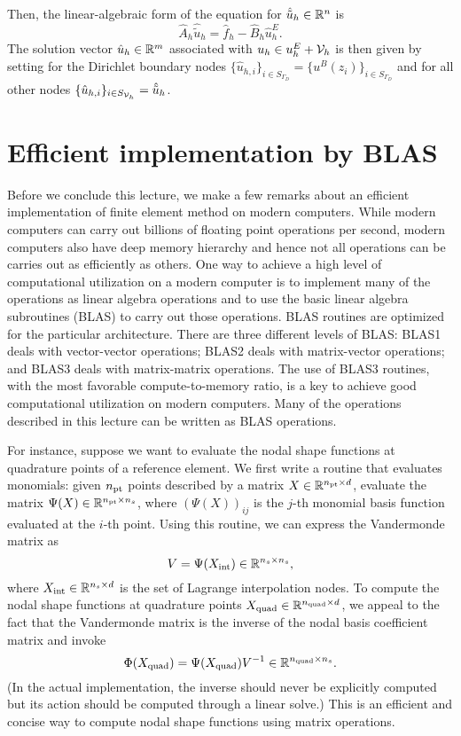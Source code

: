 Then, the linear-algebraic form of the equation for $\hat{\tilde u}_h \in \mathbb{R}^n$ is
\begin{equation*}
  \hat A_h \hat{\tilde u}_h = \hat f_h - \hat B_h \hat u^E_h.
\end{equation*}
The solution vector $\hat u_h \in \mathbb{R}^m$ associated with $u_h \in u^E_h + \mathcal{V}_h$ is then given by setting for the Dirichlet boundary nodes $\{ \hat u_{h,i} \}_{i \in S_{\Gamma_D}} = \{ u^B(z_i) \}_{i \in S_{\Gamma_D}}$ and for all other nodes $\{ \hat u_{h,i} \}_{i \in S_{\mathcal{V}_h}} = \hat{\tilde u}_h$.

\section{Efficient implementation by BLAS}
\label{sec:fe_impl_blas}
Before we conclude this lecture, we make a few remarks about an efficient implementation of finite element method on modern computers.  While modern computers can carry out billions of floating point operations per second, modern computers also have deep memory hierarchy and hence not all operations can be carries out as efficiently as others.  One way to achieve a high level of computational utilization on a modern computer is to implement many of the operations as linear algebra operations and to use the basic linear algebra subroutines (BLAS) to carry out those operations.  BLAS routines are optimized for the particular architecture.  There are three different levels of BLAS: BLAS1 deals with vector-vector operations; BLAS2 deals with matrix-vector operations; and BLAS3 deals with matrix-matrix operations. The use of BLAS3 routines, with the most favorable compute-to-memory ratio, is a key to achieve good computational utilization on modern computers.  Many of the operations described in this lecture can be written as BLAS operations.

For instance, suppose we want to evaluate the nodal shape functions at quadrature points of a reference element.  We first write a routine that evaluates monomials: given $n_{\rm pt}$ points described by a matrix $X \in \mathbb{R}^{n_{\rm pt} \times d}$, evaluate the matrix $\Psi(X) \in \mathbb{R}^{n_{\rm pt} \times n_s}$, where $(\Psi(X))_{ij}$ is the $j$-th monomial basis function evaluated at the $i$-th point. Using this routine, we can express the Vandermonde matrix as
\begin{equation*}
  V = \Psi(X_{\rm int}) \in \mathbb{R}^{n_s \times n_s},
\end{equation*}
where $X_{\rm int} \in \mathbb{R}^{n_s \times d}$ is the set of Lagrange interpolation nodes.  To compute the nodal shape functions at quadrature points $X_{\rm quad} \in \mathbb{R}^{n_{\rm quad} \times d}$, we appeal to the fact that the Vandermonde matrix is the inverse of the nodal basis coefficient matrix and invoke
\begin{equation*}
  \Phi(X_{\rm quad}) = \Psi(X_{\rm quad}) V^{-1} \in \mathbb{R}^{n_{\rm quad} \times n_s}.
\end{equation*}
(In the actual implementation, the inverse should never be explicitly computed but its action should be computed through a linear solve.)  This is an efficient and concise way to compute nodal shape functions using matrix operations.


